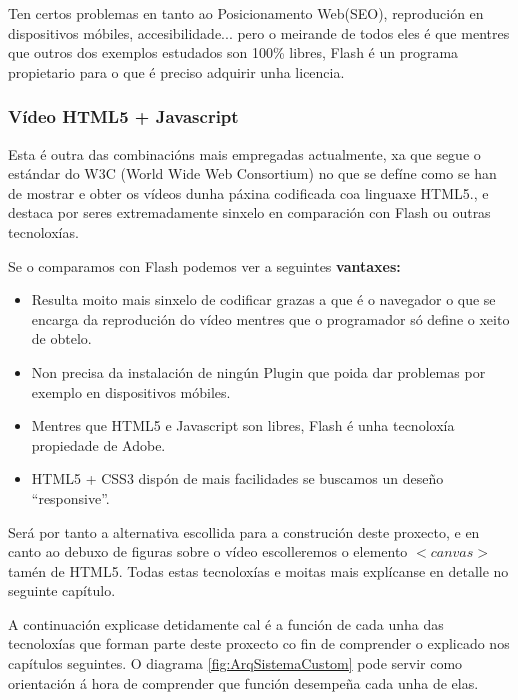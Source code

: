             Ten certos problemas en tanto ao Posicionamento Web(SEO), reprodución en 
            dispositivos móbiles, accesibilidade... pero o meirande de todos eles é que mentres
            que outros dos exemplos estudados son 100\% libres, Flash é un programa propietario
            para o que é preciso adquirir unha licencia.        
            
        
        \subsubsection{Vídeo HTML5 + Javascript}
            Esta é outra das combinacións mais empregadas actualmente, xa que segue o estándar
            do W3C (World Wide Web Consortium)\cite{w3schools-video-tag} no que se defíne como se
            han de mostrar e obter os vídeos dunha páxina codificada coa linguaxe HTML5., e 
            destaca por seres extremadamente sinxelo en comparación con Flash ou outras tecnoloxías.
            
            Se o comparamos con Flash podemos ver a seguintes \textbf{vantaxes:}
            \begin{itemize}
                \item Resulta moito mais sinxelo de codificar grazas a que é o navegador o que se 
                encarga da reprodución do vídeo mentres que o programador só define o xeito de obtelo.
                \item Non precisa da instalación de ningún Plugin que poida dar problemas por exemplo 
                en dispositivos móbiles.
                \item Mentres que HTML5 e Javascript son libres, Flash é unha tecnoloxía propiedade de 
                Adobe.
                \item HTML5 + CSS3 dispón de mais facilidades se buscamos un deseño ``responsive''.
            \end{itemize}

            Será por tanto a alternativa escollida para a construción deste proxecto, e en canto ao 
            debuxo de figuras sobre o vídeo escolleremos o elemento $<canvas>$ tamén de HTML5. Todas
            estas tecnoloxías e moitas mais explícanse en detalle no seguinte capítulo.
            
    
    
    
    A continuación explicase detidamente cal é a función de cada unha das tecnoloxías que forman 
    parte deste proxecto co fin de comprender o explicado nos capítulos seguintes. O diagrama 
    \ref{fig:ArqSistemaCustom} pode servir como orientación á hora de comprender que función 
    desempeña cada unha de elas.
    
